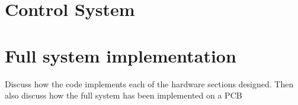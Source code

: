 \section{Control System}\label{S:control_impl}


\section{Full system implementation}

Discuss how the code implements each of the hardware sections designed. Then also discuss how the full system has been implemented on a PCB 

